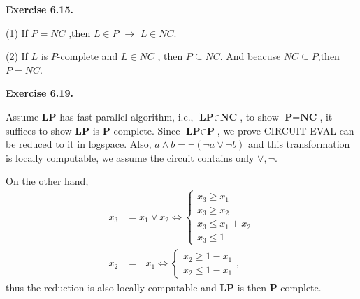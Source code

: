 \documentclass[a4paper]{article}
\newenvironment{exercise}[1]{
	\par
	\noindent\textbf{Exercise #1.}\quad
}{
	\par
	\bigskip
}
\begin{document}
\begin{exercise}{6.15}
    (1) If $P=NC$ ,then $L\in P$ $\rightarrow$ $L \in NC$.
    
    (2) If $L$ is $P$-complete and $L \in NC$ , then $P\subseteq NC$.
        And beacuse $NC\subseteq P$,then $P=NC$.
\end{exercise}

\begin{exercise}{6.19}
    Assume \textbf{LP} has fast parallel algorithm, i.e., 
    $\textbf{LP}\in\textbf{NC}$, to show $\textbf{P}=\textbf{NC}$, it suffices
    to show \textbf{LP} is $\textbf{P}$-complete. Since $\textbf{LP}\in\textbf{P}$, we prove CIRCUIT-EVAL can be
    reduced to it in logspace. Also, $a\land b=\neg(\neg a\lor\neg b)$ and this transformation is locally computable,
    we assume the circuit contains only $\lor,\neg$.

    On the other hand,
    \begin{align*}
        x_3&=x_1\lor x_2\iff\begin{cases}
            x_3\geq x_1\\
            x_3\geq x_2\\
            x_3\leq x_1+x_2\\
            x_3\leq 1
        \end{cases}\\
        x_2&=\neg x_1\iff\begin{cases}
            x_2\geq 1-x_1\\
            x_2\leq 1-x_1
        \end{cases},
    \end{align*}
    thus the reduction is also locally computable and \textbf{LP} is then \textbf{P}-complete.
\end{exercise}
\end{document}
